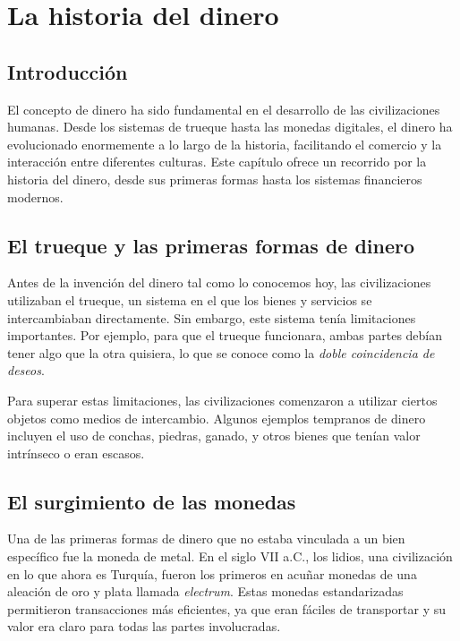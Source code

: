 \chapter{La historia del dinero}

\section{Introducción}

El concepto de dinero ha sido fundamental en el desarrollo de las civilizaciones humanas. Desde los sistemas de trueque hasta las monedas digitales, el dinero ha evolucionado enormemente a lo largo de la historia, facilitando el comercio y la interacción entre diferentes culturas. Este capítulo ofrece un recorrido por la historia del dinero, desde sus primeras formas hasta los sistemas financieros modernos.

\section{El trueque y las primeras formas de dinero}

Antes de la invención del dinero tal como lo conocemos hoy, las civilizaciones utilizaban el trueque, un sistema en el que los bienes y servicios se intercambiaban directamente. Sin embargo, este sistema tenía limitaciones importantes. Por ejemplo, para que el trueque funcionara, ambas partes debían tener algo que la otra quisiera, lo que se conoce como la \textit{doble coincidencia de deseos}.

Para superar estas limitaciones, las civilizaciones comenzaron a utilizar ciertos objetos como medios de intercambio. Algunos ejemplos tempranos de dinero incluyen el uso de conchas, piedras, ganado, y otros bienes que tenían valor intrínseco o eran escasos.

\section{El surgimiento de las monedas}

Una de las primeras formas de dinero que no estaba vinculada a un bien específico fue la moneda de metal. En el siglo VII a.C., los lidios, una civilización en lo que ahora es Turquía, fueron los primeros en acuñar monedas de una aleación de oro y plata llamada \textit{electrum}. Estas monedas estandarizadas permitieron transacciones más eficientes, ya que eran fáciles de transportar y su valor era claro para todas las partes involucradas.

